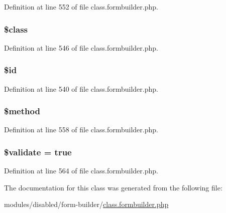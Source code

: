 Definition at line 552 of file class.\-formbuilder.\-php.

\hypertarget{class_form_builder_a252ba022809910ea710a068fc1bab657}{
\subsubsection[{\$class}]{\setlength{\rightskip}{0pt plus 5cm}\$class}}\label{class_form_builder_a252ba022809910ea710a068fc1bab657}


Definition at line 546 of file class.\-formbuilder.\-php.

\hypertarget{class_form_builder_ae97941710d863131c700f069b109991e}{
\subsubsection[{\$id}]{\setlength{\rightskip}{0pt plus 5cm}\$id}}\label{class_form_builder_ae97941710d863131c700f069b109991e}


Definition at line 540 of file class.\-formbuilder.\-php.

\hypertarget{class_form_builder_a12661b2fc0f57f97e30a1620889ce9c6}{
\subsubsection[{\$method}]{\setlength{\rightskip}{0pt plus 5cm}\$method}}\label{class_form_builder_a12661b2fc0f57f97e30a1620889ce9c6}


Definition at line 558 of file class.\-formbuilder.\-php.

\hypertarget{class_form_builder_a320b75b46e1832c327d9d47b4cea9e7d}{
\subsubsection[{\$validate}]{\setlength{\rightskip}{0pt plus 5cm}\${\bf validate} = true}}\label{class_form_builder_a320b75b46e1832c327d9d47b4cea9e7d}


Definition at line 564 of file class.\-formbuilder.\-php.



The documentation for this class was generated from the following file\-:\begin{DoxyCompactItemize}
\item 
modules/disabled/form-\/builder/\hyperlink{class_8formbuilder_8php}{class.\-formbuilder.\-php}\end{DoxyCompactItemize}
